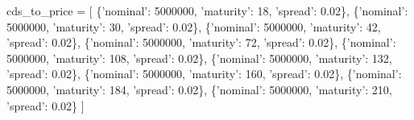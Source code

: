 \documentclass[11pt]{article}
\newenvironment{Shaded}{}{}
\newcommand{\DecValTok}[1]{\textcolor[rgb]{0.25,0.63,0.44}{{#1}}}
\newcommand{\FloatTok}[1]{\textcolor[rgb]{0.25,0.63,0.44}{{#1}}}
\newcommand{\StringTok}[1]{\textcolor[rgb]{0.25,0.44,0.63}{{#1}}}
\newcommand{\NormalTok}[1]{{#1}}
\newcommand{\OperatorTok}[1]{\textcolor[rgb]{0.40,0.40,0.40}{{#1}}}
\begin{document}
\begin{Shaded}
\begin{Highlighting}[]
\NormalTok{cds_to_price }\OperatorTok{=}\NormalTok{ [}
\NormalTok{    \{}\StringTok{'nominal'}\NormalTok{: }\DecValTok{5000000}\NormalTok{, }\StringTok{'maturity'}\NormalTok{: }\DecValTok{18}\NormalTok{, }\StringTok{'spread'}\NormalTok{: }\FloatTok{0.02}\NormalTok{\},}
\NormalTok{    \{}\StringTok{'nominal'}\NormalTok{: }\DecValTok{5000000}\NormalTok{, }\StringTok{'maturity'}\NormalTok{: }\DecValTok{30}\NormalTok{, }\StringTok{'spread'}\NormalTok{: }\FloatTok{0.02}\NormalTok{\},}
\NormalTok{    \{}\StringTok{'nominal'}\NormalTok{: }\DecValTok{5000000}\NormalTok{, }\StringTok{'maturity'}\NormalTok{: }\DecValTok{42}\NormalTok{, }\StringTok{'spread'}\NormalTok{: }\FloatTok{0.02}\NormalTok{\},}
\NormalTok{    \{}\StringTok{'nominal'}\NormalTok{: }\DecValTok{5000000}\NormalTok{, }\StringTok{'maturity'}\NormalTok{: }\DecValTok{72}\NormalTok{, }\StringTok{'spread'}\NormalTok{: }\FloatTok{0.02}\NormalTok{\},}
\NormalTok{    \{}\StringTok{'nominal'}\NormalTok{: }\DecValTok{5000000}\NormalTok{, }\StringTok{'maturity'}\NormalTok{: }\DecValTok{108}\NormalTok{, }\StringTok{'spread'}\NormalTok{: }\FloatTok{0.02}\NormalTok{\},}
\NormalTok{    \{}\StringTok{'nominal'}\NormalTok{: }\DecValTok{5000000}\NormalTok{, }\StringTok{'maturity'}\NormalTok{: }\DecValTok{132}\NormalTok{, }\StringTok{'spread'}\NormalTok{: }\FloatTok{0.02}\NormalTok{\},}
\NormalTok{    \{}\StringTok{'nominal'}\NormalTok{: }\DecValTok{5000000}\NormalTok{, }\StringTok{'maturity'}\NormalTok{: }\DecValTok{160}\NormalTok{, }\StringTok{'spread'}\NormalTok{: }\FloatTok{0.02}\NormalTok{\},}
\NormalTok{    \{}\StringTok{'nominal'}\NormalTok{: }\DecValTok{5000000}\NormalTok{, }\StringTok{'maturity'}\NormalTok{: }\DecValTok{184}\NormalTok{, }\StringTok{'spread'}\NormalTok{: }\FloatTok{0.02}\NormalTok{\},}
\NormalTok{    \{}\StringTok{'nominal'}\NormalTok{: }\DecValTok{5000000}\NormalTok{, }\StringTok{'maturity'}\NormalTok{: }\DecValTok{210}\NormalTok{, }\StringTok{'spread'}\NormalTok{: }\FloatTok{0.02}\NormalTok{\}}
\NormalTok{]}
\end{Highlighting}
\end{Shaded}


    
    
    
    
\end{document}
